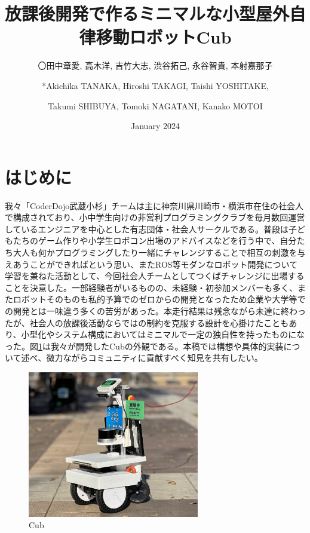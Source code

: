 \documentclass[platex,dvipdfmx]{rbproceedings}
\title{放課後開発で作るミニマルな小型屋外自律移動ロボットCub}
\author{〇田中章愛, 高木洋, 吉竹大志, 渋谷拓己, 永谷智貴, 本射嘉那子\and *Akichika TANAKA, Hiroshi TAKAGI, Taishi YOSHITAKE,\and Takumi SHIBUYA, Tomoki NAGATANI, Kanako MOTOI}
\affil{チーム名:CoderDojo武蔵小杉 \space ロボット名:Cub}
\date{January 2024}
\begin{document}
\maketitle

\section{はじめに}
我々「CoderDojo武蔵小杉」チームは主に神奈川県川崎市・横浜市在住の社会人で構成されており、小中学生向けの非営利プログラミングクラブを毎月数回運営しているエンジニアを中心とした有志団体・社会人サークルである。普段は子どもたちのゲーム作りや小学生ロボコン出場のアドバイスなどを行う中で、自分たち大人も何かプログラミングしたり一緒にチャレンジすることで相互の刺激を与えあうことができればという思い、またROS等モダンなロボット開発について学習を兼ねた活動として、今回社会人チームとしてつくばチャレンジに出場することを決意した。一部経験者がいるものの、未経験・初参加メンバーも多く、またロボットそのものも私的予算でのゼロからの開発となったため企業や大学等での開発とは一味違う多くの苦労があった。本走行結果は残念ながら未達に終わったが、社会人の放課後活動ならではの制約を克服する設計を心掛けたこともあり、小型化やシステム構成においてはミニマルで一定の独自性を持ったものになった。図\ref{fig:cub}は我々が開発したCubの外観である。本稿では構想や具体的実装について述べ、微力ながらコミュニティに貢献すべく知見を共有したい。
\begin{figure}[t]
  \centering
  \includegraphics[width=75mm]{./picture/cub.jpg}
    \caption{Cub}
  \label{fig:cub}%
\end{figure}


\end{document}
